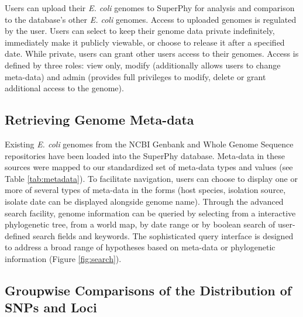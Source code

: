 \documentclass[a4paper,twoside]{article}
\begin{document}
Users can upload their \textit{E. coli} genomes to SuperPhy for analysis and comparison to the database's other \textit{E. coli} genomes.  Access to uploaded genomes is regulated by the user. Users can select to keep their genome data private indefinitely, immediately make it publicly viewable, or choose to release it after a specified date.  While private, users can grant other users access to their genomes.  Access is defined by three roles: view only, modify (additionally allows users to change meta-data) and admin (provides full privileges to modify, delete or grant additional access to the genome).

\subsection{Retrieving Genome Meta-data}

Existing \textit{E. coli} genomes from the NCBI Genbank and Whole Genome Sequence repositories \cite{benson2013genbank} have been loaded into the SuperPhy database. Meta-data in these sources were mapped to our standardized set of meta-data types and values (see Table \ref{tab:metadata}). To facilitate navigation,
users can choose to display one or more of several types of meta-data in the forms (host species, isolation source, isolate date can be displayed alongside genome name). Through the advanced search facility, genome information can be queried by selecting from a interactive phylogenetic tree, from a world map, by date range or by boolean search of user-defined search fields and keywords.  The sophisticated query interface is designed to address a broad range of hypotheses based on meta-data or phylogenetic information (Figure \ref{fig:search}).

\begin{figure*}[t]
  \vspace{-0.2cm}
  \centering
   {}
  \caption{Advanced search function in SuperPhy. Genome information can be queried by (A) interactive phylogenetic tree (B) world map or (C) boolean search of user-specified fields and keywords. }
  \label{fig:search}
\end{figure*}

\subsection{Groupwise Comparisons of the Distribution of SNPs and Loci}
\end{document}
